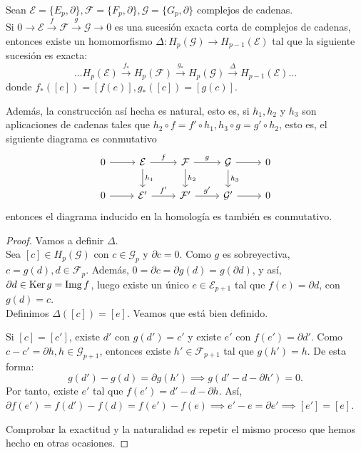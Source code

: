 \begin{theorem}
  Sean $\mathcal{E} = \{E_p, \partial\}, \mathcal{F} = \{F_p, \partial\}, \mathcal{G} = \{G_p, \partial\}$ complejos de cadenas. \\
  Si $0 \to \mathcal{E} \xrightarrow{f} \mathcal{F} \xrightarrow{g} \mathcal{G} \to 0$ es una sucesión exacta corta de complejos
  de cadenas, entonces existe un homomorfismo $\Delta \colon H_p(\mathcal{G}) \to H_{p-1}(\mathcal{E})$ tal que la siguiente
  sucesión es exacta:
  \[ \dots H_p(\mathcal{E}) \xrightarrow{f_*} H_p(\mathcal{F}) \xrightarrow{g_*} H_p(\mathcal{G}) \xrightarrow{\Delta} H_{p-1}(\mathcal{E}) \dots \]
  donde $f_*([e]) = [f(e)], g_*([c]) = [g(c)]$.

  Además, la construcción así hecha es natural, esto es, si $h_1, h_2$ y $h_3$ son aplicaciones de cadenas tales que
  $h_2 \circ f = f' \circ h_1, h_3 \circ g = g' \circ h_2$, esto es, el siguiente diagrama es conmutativo
  \[ \begin{tikzcd}
    0 \arrow{r} & \mathcal{E} \arrow{r}{f} \arrow{d}{h_1} & \mathcal{F} \arrow{r}{g} \arrow{d}{h_2} & \mathcal{G} \arrow{r} \arrow{d}{h_3} & 0 \\
    0 \arrow{r} & \mathcal{E'} \arrow{r}{f'} & \mathcal{F'} \arrow{r}{g'} & \mathcal{G'} \arrow{r} & 0
  \end{tikzcd} \]
  entonces el diagrama inducido en la homología es también es conmutativo.
\end{theorem}

\begin{proof}
  Vamos a definir $\Delta$. \\
  Sea $[c] \in H_p(\mathcal G)$ con $c \in \mathcal G_p$ y $\partial c = 0$. Como $g$ es sobreyectiva, $c = g(d), d \in \mathcal F_p$.
  Además, $0 = \partial c = \partial g(d) = g(\partial d)$, y así, $\partial d \in \operatorname{Ker} g = \operatorname{Img} f$, luego existe un único $e \in \mathcal E_{p+1}$
  tal que $f(e) = \partial d$, con $g(d) = c$. \\
  Definimos $\Delta([c]) = [e]$. Veamos que está bien definido.

  Si $[c] = [c']$, existe $d'$ con $g(d') = c'$ y existe $e'$ con $f(e') = \partial d'$. Como $c - c' = \partial h, h \in \mathcal G_{p+1}$,
  entonces existe $h' \in \mathcal F_{p+1}$ tal que $g(h') = h$. De esta forma:
  \[ g(d') - g(d) = \partial g(h') \implies g(d' - d - \partial h') = 0. \]
  Por tanto, existe $e'$ tal que $f(e') = d' - d - \partial h$. Así, $\partial f(e') = f(d') - f(d) = f(e') - f(e) \implies e' - e = \partial e'
  \implies [e'] = [e]$.

  Comprobar la exactitud y la naturalidad es repetir el mismo proceso que hemos hecho en otras ocasiones.
\end{proof}

